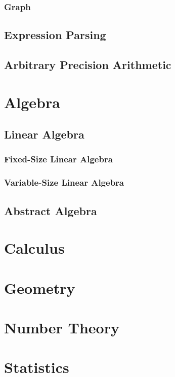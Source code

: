 \documentclass[a4paper,oneside]{article}
\begin{document}
\subsubsection{Graph}

\subsection{Expression Parsing}

\subsection{Arbitrary Precision Arithmetic}

\section{Algebra}

\subsection{Linear Algebra}

\subsubsection{Fixed-Size Linear Algebra}

\subsubsection{Variable-Size Linear Algebra}

\subsection{Abstract Algebra}

\section{Calculus}

\section{Geometry}

\section{Number Theory}

\section{Statistics}
\end{document}

